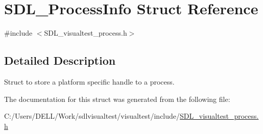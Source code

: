 \hypertarget{struct_s_d_l___process_info}{\section{S\-D\-L\-\_\-\-Process\-Info Struct Reference}
\label{struct_s_d_l___process_info}
}


{\ttfamily \#include $<$S\-D\-L\-\_\-visualtest\-\_\-process.\-h$>$}



\subsection{Detailed Description}
Struct to store a platform specific handle to a process. 

The documentation for this struct was generated from the following file\-:\begin{DoxyCompactItemize}
\item 
C\-:/\-Users/\-D\-E\-L\-L/\-Work/sdlvisualtest/visualtest/include/\hyperlink{_s_d_l__visualtest__process_8h}{S\-D\-L\-\_\-visualtest\-\_\-process.\-h}\end{DoxyCompactItemize}
